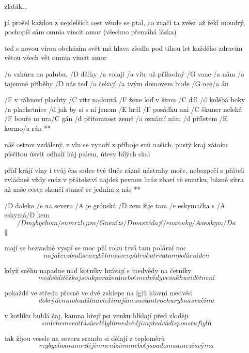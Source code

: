 \r zlaťák...

já prošel každou z nejdelších cest
všude se ptal, co značí ta zvěst
až řekl moudrý, pochopíš sám
omnia vincit amor (všechno přemáhá láska) \s

\rr

teď s novou vírou obcházím svět
má hlava zšedla pod tíhou let
každého zdravím větou všech vět
omnia vincit amor




/a vzhůru na palubu, /D dálky /a volají
/a vítr už příhodný /G vane /a nám
/a tajemné příběhy /D nás teď /a čekají
/a tvým domovem bude /G oce/a án

\R  /F v ráhnoví plachty /C vítr nadouvá
    /F žene loď v širou /C dál
    /d kolébá boky /a plachetnice
    /d jak by si s ní jenom /E hrál
    /F posádku ani /C škuner neleká
    /F bouře ni ura/C gán
    /d přítomnost země /a oznámí nám
    /d příletem /E kormo/a rán **

náš ostrov vzdálený, z vln se vynoří
z příboje snů našich, pustý kraj
zátoku písčitou úsvit odhalí
háj palem, útesy bílých skal

\R  příď krájí vlny i tvůj čas
    srdce tvé tluče rázně
    nástrahy moře, nebezpečí
    s přáteli zvládneš vždy snáz
    v přátelství najdeš pevnou hráz
    zbaví tě smutku, bázně
    zítra až naše cesta skončí
    staneš se jedním z nás **




/D daleko /e na severu /A je grónská /D zem
žije tam /e eskymačka s /A eskymá/D kem
\[ /D my bychom /e umrzli jim /G není zi/D ma
snídají /e nanuky /A a eskym/D a \]\S

mají se bezvadně vyspí se moc
půl roku trvá tam polární noc
\[ na jaře vzbudí se a vyběhnou ven
půl roku trvá tam polární den \]\s

když sněhu napadne nad kotníky
hrávají s medvědy na četníky
\[ medvědi těžko jsou k poražení
neboť medvědy ve sněhu vidět není \]\s

pokaždé ve středu přesně ve dvě
zaklepe na íglů hlavní medvěd
\[ dobrý den mohu dál na vteřinu
já nesu vám trochu ryb na svačinu \]\s

v kotlíku bublá čaj, kamna hřejí
psi venku hlídají před zloději
\[ smíchem se otřásá celé íglů
medvěd jim předvádí spoustu fíglů \]\s

tak žijou vesele na severu
srandu si dělají z teploměrů
\[ my bychom umrzli jim není zima
neboť jsou doma a mezi svýma \]



